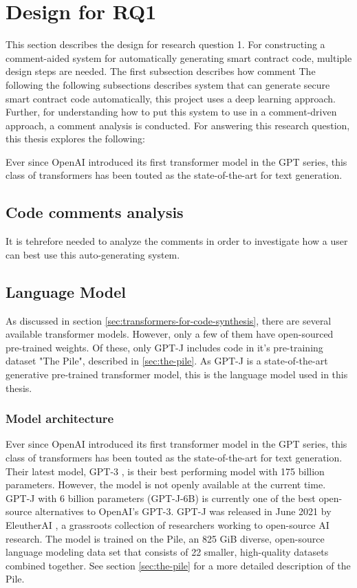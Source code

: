 \section{Design for RQ1}
\label{sec:design-for-rq1}
This section describes the design for research question 1. For constructing a comment-aided system for automatically generating smart contract code, multiple design steps are needed. The first subsection describes how comment The following the following subsections describes system that can generate secure smart contract code automatically, this project uses a deep learning approach. Further, for understanding how to put this system to use in a comment-driven approach, a comment analysis is conducted. 
For answering this research question, this thesis explores the following:


Ever since OpenAI introduced its first transformer model in the GPT series, this class of transformers has been touted as the state-of-the-art for text generation.

\subsection{Code comments analysis}
\label{sec:code-comments-analysis}
It is tehrefore needed to analyze the comments in order to investigate how a user can best use this auto-generating system.

\subsection{Language Model}
\label{sec:language-model}
As discussed in section \cref{sec:transformers-for-code-synthesis}, there are several available transformer models. However, only a few of them have open-sourced pre-trained weights. Of these, only GPT-J \cite{gpt-j} includes code in it's pre-training dataset "The Pile", described in \cref{sec:the-pile}. As GPT-J is a state-of-the-art generative pre-trained transformer model, this is the language model used in this thesis. 

\subsubsection{Model architecture}
\label{sec:architecture}
Ever since OpenAI introduced its first transformer model in the GPT series, this class of transformers has been touted as the state-of-the-art for text generation. Their latest model, GPT-3 \cite{brown2020language}, is their best performing model with 175 billion parameters. However, the model is not openly available at the current time. GPT-J \cite{gpt-j} with 6 billion parameters (GPT-J-6B) is currently one of the best open-source alternatives to OpenAI's GPT-3. GPT-J was released in June 2021 by EleutherAI \cite{elutherai}, a grassroots collection of researchers working to open-source AI research. The model is trained on the Pile, an 825 GiB diverse, open-source language modeling data set that consists of 22 smaller, high-quality datasets combined together. See section \cref{sec:the-pile} for a more detailed description of the Pile.

